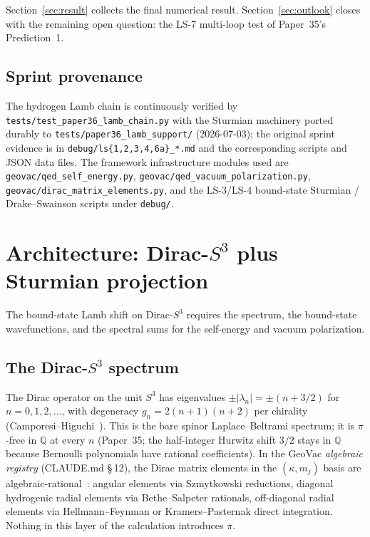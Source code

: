 \documentclass[11pt]{article}
\begin{document}
Section~\ref{sec:result} collects the final numerical result.
Section~\ref{sec:outlook} closes with the remaining open question:
the LS-7 multi-loop test of Paper~35's Prediction~1.

\subsection*{Sprint provenance}
The hydrogen Lamb chain is continuously verified by
\texttt{tests/test\_paper36\_lamb\_chain.py} with the Sturmian
machinery ported durably to \texttt{tests/paper36\_lamb\_support/}
(2026-07-03); the original sprint evidence is in
\texttt{debug/ls\{1,2,3,4,6a\}\_*.md} and the corresponding scripts
and JSON data files.  The framework infrastructure modules used are
\texttt{geovac/qed\_self\_energy.py}, \texttt{geovac/qed\_vacuum\_polarization.py},
\texttt{geovac/dirac\_matrix\_elements.py}, and the LS-3/LS-4 bound-state
Sturmian / Drake--Swainson scripts under \texttt{debug/}.

\section{Architecture: Dirac-$S^3$ plus Sturmian projection}
\label{sec:architecture}

The bound-state Lamb shift on Dirac-$S^3$ requires the spectrum, the
bound-state wavefunctions, and the spectral sums for the
self-energy and vacuum polarization.

\subsection{The Dirac-$S^3$ spectrum}

The Dirac operator on the unit $S^3$ has eigenvalues
$\pm |\lambda_n| = \pm(n + 3/2)$ for $n = 0, 1, 2, \ldots$, with
degeneracy $g_n = 2(n+1)(n+2)$ per chirality
(Camporesi--Higuchi~\cite{camporesi_higuchi}).  This is the bare
spinor Laplace--Beltrami spectrum; it is $\pi$-free in
$\mathbb{Q}$ at every $n$ (Paper~35; the
half-integer Hurwitz shift $3/2$ stays in $\mathbb{Q}$ because
Bernoulli polynomials have rational coefficients).  In the GeoVac
\emph{algebraic registry} (CLAUDE.md \S\,12), the Dirac matrix
elements in the $(\kappa, m_j)$ basis are
algebraic-rational~\cite{paper14}: angular elements via
Szmytkowski reductions, diagonal hydrogenic radial elements via
Bethe--Salpeter rationals, off-diagonal radial elements via
Hellmann--Feynman or Kramers--Pasternak direct integration.  Nothing
in this layer of the calculation introduces $\pi$.
\end{document}
